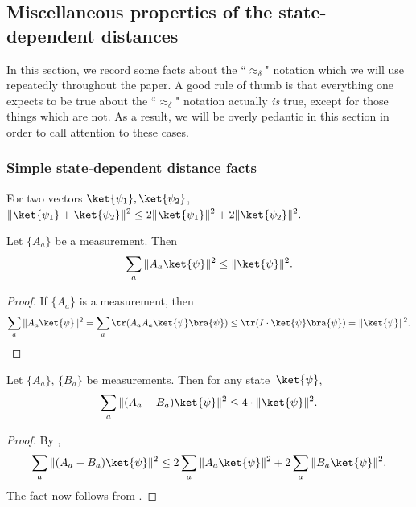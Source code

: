\documentclass[11pt]{article}
\begin{document}
\subsection{Miscellaneous properties of the state-dependent distances}

In this section, we record some facts about the ``$\approx_\delta$" notation which we will use repeatedly throughout the paper.
A good rule of thumb is that everything one expects to be true about the ``$\approx_\delta$" notation actually \emph{is}  true,
except for those things which are not. 
As a result, we will be overly pedantic in this section in order to call attention to these cases.

\subsubsection{Simple state-dependent distance facts}

\begin{fact}\label{fact:obvious-vector-fact}
For two vectors $\ket{\psi_1}, \ket{\psi_2}$, 
$\displaystyle
\Vert \ket{\psi_1} + \ket{\psi_2} \Vert^2 \leq 2 \Vert \ket{\psi_1} \Vert^2 + 2 \Vert \ket{\psi_2} \Vert^2.
$
\end{fact}

\begin{fact}\label{fact:measurement-sub-measurement-switcheroo}
Let $\{A_a\}$ be a measurement. Then
\begin{equation*}
\sum_a \Vert A_{a} \ket{\psi}\Vert^2 \leq\Vert \ket{\psi} \Vert^2.
\end{equation*}
\end{fact}
\begin{proof}
If $\{A_a\}$ is a measurement, then
\begin{equation*}
\sum_a \Vert A_{a} \ket{\psi}\Vert^2
= \sum_a \tr( A_a A_{a} \ket{\psi}\bra{\psi})
\leq \tr(I \cdot \ket{\psi}\bra{\psi}) = \Vert \ket{\psi}\Vert^2.\qedhere
\end{equation*}
\end{proof}

\begin{fact}\label{fact:easy-bound}
Let $\{A_a\}$, $\{B_a\}$ be measurements. Then for any state~$\ket{\psi}$,
\begin{equation*}
\sum_a \Vert (A_{a} - B_{a} ) \ket{\psi}\Vert^2 \leq 4 \cdot \Vert \ket{\psi} \Vert^2.
\end{equation*}
\end{fact}
\begin{proof}
By ,
\begin{equation*}
\sum_a \Vert (A_{a} - B_{a} ) \ket{\psi}\Vert^2 \leq 2 \sum_a \Vert A_{a} \ket{\psi}\Vert^2 + 2 \sum_a \Vert  B_{a} \ket{\psi}\Vert^2.
\end{equation*}
The fact now follows from .
\end{proof}
\end{document}
